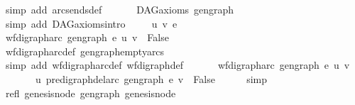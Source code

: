 \begin{isabellebody}
\ {\isacharparenleft}{\kern0pt}simp\ add{\isacharcolon}{\kern0pt}\ arcs{\isacharunderscore}{\kern0pt}ends{\isacharunderscore}{\kern0pt}def{\isacharparenright}{\kern0pt}\ \isanewline
\ \ \isamarkupfalse%
\ \isamarkupfalse%
\ {\isachardoublequoteopen}DAG{\isacharunderscore}{\kern0pt}axioms\ gen{\isacharunderscore}{\kern0pt}graph{\isachardoublequoteclose}\isanewline
\ \ \ \ \isamarkupfalse%
\ {\isacharparenleft}{\kern0pt}simp\ add{\isacharcolon}{\kern0pt}\ DAG{\isacharunderscore}{\kern0pt}axioms{\isachardot}{\kern0pt}intro{\isacharparenright}{\kern0pt}\ \isanewline
{}\isamarkupfalse%
\isanewline
\ \ \isamarkupfalse%
\ u\ v\ e\ \isanewline
\ \ \isamarkupfalse%
\ {\isachardoublequoteopen}wf{\isacharunderscore}{\kern0pt}digraph{\isachardot}{\kern0pt}arc\ gen{\isacharunderscore}{\kern0pt}graph\ e\ {\isacharparenleft}{\kern0pt}u{\isacharcomma}{\kern0pt}\ v{\isacharparenright}{\kern0pt}\ {\isasymequiv}\ False{\isachardoublequoteclose}\isanewline
\ \ \ \ \isamarkupfalse%
\ wf{\isacharunderscore}{\kern0pt}digraph{\isachardot}{\kern0pt}arc{\isacharunderscore}{\kern0pt}def\ gen{\isacharunderscore}{\kern0pt}graph{\isacharunderscore}{\kern0pt}empty{\isacharunderscore}{\kern0pt}arcs\isanewline
\ \ \ \ \isamarkupfalse%
\ {\isacharparenleft}{\kern0pt}simp\ add{\isacharcolon}{\kern0pt}\ wf{\isacharunderscore}{\kern0pt}digraph{\isachardot}{\kern0pt}arc{\isacharunderscore}{\kern0pt}def\ wf{\isacharunderscore}{\kern0pt}digraph{\isacharunderscore}{\kern0pt}def{\isacharparenright}{\kern0pt}\ \isanewline
\ \ \isamarkupfalse%
\ \isamarkupfalse%
\ {\isachardoublequoteopen}wf{\isacharunderscore}{\kern0pt}digraph{\isachardot}{\kern0pt}arc\ gen{\isacharunderscore}{\kern0pt}graph\ e\ {\isacharparenleft}{\kern0pt}u{\isacharcomma}{\kern0pt}\ v{\isacharparenright}{\kern0pt}\ {\isasymLongrightarrow}\isanewline
\ \ \ \ \ \ \ u\ {\isasymrightarrow}\isactrlsup {\isacharasterisk}{\kern0pt}\isactrlbsub pre{\isacharunderscore}{\kern0pt}digraph{\isachardot}{\kern0pt}del{\isacharunderscore}{\kern0pt}arc\ gen{\isacharunderscore}{\kern0pt}graph\ e\isactrlesub \ v\ {\isasymLongrightarrow}\ False{\isachardoublequoteclose}\isanewline
\ \ \ \ \isamarkupfalse%
\ simp\isanewline
{}\isamarkupfalse%
\ \ \isanewline
\ \ \isamarkupfalse%
\ refl{\isacharcolon}{\kern0pt}\ {\isachardoublequoteopen}genesis{\isacharunderscore}{\kern0pt}node\ {\isasymrightarrow}\isactrlsup {\isacharasterisk}{\kern0pt}\isactrlbsub gen{\isacharunderscore}{\kern0pt}graph\isactrlesub \ genesis{\isacharunderscore}{\kern0pt}node{\isachardoublequoteclose}\isanewline

\end{isabellebody}
